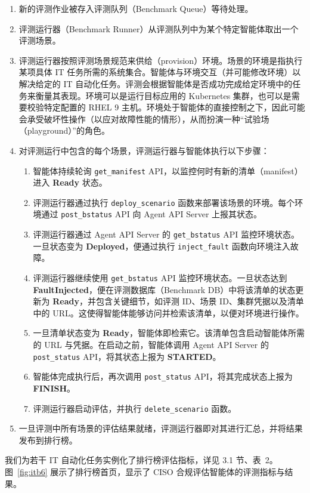 \begin{enumerate}
\item 新的评测作业被存入评测队列（Benchmark Queue）等待处理。
\item 评测运行器（Benchmark Runner）从评测队列中为某个特定智能体取出一个评测场景。
\item 评测运行器按照评测场景规范来供给（provision）环境。场景的环境是指执行某项具体 IT 任务所需的系统集合。智能体与环境交互（并可能修改环境）以解决给定的 IT 自动化任务。评测会根据智能体是否成功完成给定环境中的任务来衡量其表现。环境可以是运行目标应用的 Kubernetes 集群，也可以是需要校验特定配置的 RHEL 9 主机。环境处于智能体的直接控制之下，因此可能会承受破坏性操作（以应对故障性能的情形），从而扮演一种“试验场（playground）”的角色。
\item 对评测运行中包含的每个场景，评测运行器与智能体执行以下步骤：
\begin{enumerate}
\item[(a)] 智能体持续轮询 \texttt{get\_manifest} API，以监控何时有新的清单（manifest）进入 \textbf{Ready} 状态。
\item[(b)] 评测运行器通过执行 \texttt{deploy\_scenario} 函数来部署该场景的环境。每个环境通过 \texttt{post\_bstatus} API 向 Agent API Server 上报其状态。
\item[(c)] 评测运行器通过 Agent API Server 的 \texttt{get\_bstatus} API 监控环境状态。一旦状态变为 \textbf{Deployed}，便通过执行 \texttt{inject\_fault} 函数向环境注入故障。
\item[(d)] 评测运行器继续使用 \texttt{get\_bstatus} API 监控环境状态。一旦状态达到 \textbf{FaultInjected}，便在评测数据库（Benchmark DB）中将该清单的状态更新为 \textbf{Ready}，并包含关键细节，如评测 ID、场景 ID、集群凭据以及清单中的 URL。这使得智能体能够访问并检索该清单，以便对环境进行操作。
\item[(e)] 一旦清单状态变为 \textbf{Ready}，智能体即检索它。该清单包含启动智能体所需的 URL 与凭据。在启动之前，智能体调用 Agent API Server 的 \texttt{post\_status} API，将其状态上报为 \textbf{STARTED}。
\item[(f)] 智能体完成执行后，再次调用 \texttt{post\_status} API，将其完成状态上报为 \textbf{FINISH}。
\item[(g)] 评测运行器启动评估，并执行 \texttt{delete\_scenario} 函数。
\end{enumerate}
\item 一旦评测中所有场景的评估结果就绪，评测运行器即对其进行汇总，并将结果发布到排行榜。
\end{enumerate}

我们为若干 IT 自动化任务实例化了排行榜评估指标，详见 3.1 节、表~2。图~\ref{fig:itb6} 展示了排行榜首页，显示了 CISO 合规评估智能体的评测指标与结果。

